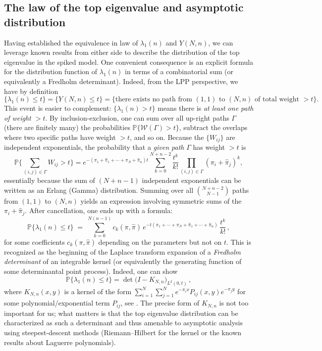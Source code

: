 \documentclass[letterpaper,11pt,oneside,reqno]{article}
\numberwithin{equation}{section}
\theoremstyle{definition}
\begin{document}
\subsection*{The law of the top eigenvalue and asymptotic distribution}
Having established the equivalence in law of $\lambda_1(n)$ and $Y(N,n)$, we can leverage known results from either side to describe the distribution of the top eigenvalue in the spiked model. One convenient consequence is an explicit formula for the distribution function of $\lambda_1(n)$ in terms of a combinatorial sum (or equivalently a Fredholm determinant). Indeed, from the LPP perspective, we have by definition
\[ \{\lambda_1(n) \le t\} = \{Y(N,n) \le t\} = \{\text{there exists no path from $(1,1)$ to $(N,n)$ of total weight $>t$}\}.\]
This event is easier to complement: $\{\lambda_1(n) > t\}$ means there is \emph{at least one path of weight $>t$}. By inclusion-exclusion, one can sum over all up-right paths $\Gamma$ (there are finitely many) the probabilities $\mathbb{P}\{\mathcal{W}(\Gamma) > t\}$, subtract the overlaps where two specific paths have weight $>t$, and so on. Because the $\{W_{ij}\}$ are independent exponentials, the probability that a \emph{given path} $\Gamma$ has weight $>\!t$ is
\[ \mathbb{P}\Big\{\sum_{(i,j)\in\Gamma} W_{ij} > t\Big\} = e^{-(\pi_1+\hat\pi_1+\cdots+\pi_N+\hat\pi_n) t} \sum_{k=0}^{N+n-2} \frac{t^k}{k!} \prod_{(i,j)\in\Gamma} (\pi_i+\hat\pi_j)^k,\]
essentially because the sum of $(N+n-1)$ independent exponentials can be written as an Erlang (Gamma) distribution. Summing over all $\binom{N+n-2}{N-1}$ paths from $(1,1)$ to $(N,n)$ yields an expression involving symmetric sums of the $\pi_i+\hat\pi_j$. After cancellation, one ends up with a formula:
\begin{equation}\label{eq:TWfiniteFredholm}
\mathbb{P}\{\lambda_1(n) \le t\} \;=\; \sum_{k=0}^{N(n-1)} c_{k}(\pi,\hat\pi)\, e^{-t (\pi_1+\cdots+\pi_N+\hat\pi_1+\cdots+\hat\pi_n)}\, \frac{t^k}{k!}\,,
\end{equation}
for some coefficients $c_k(\pi,\hat\pi)$ depending on the parameters but not on $t$. This is recognized as the beginning of the Laplace transform expansion of a \emph{Fredholm determinant} of an integrable kernel (or equivalently the generating function of some determinantal point process). Indeed, one can show
\[ \mathbb{P}\{\lambda_1(n) \le t\} = \det\big(I - K_{N,n}\big)_{L^2(0,t)}\,,\]
where $K_{N,n}(x,y)$ is a kernel of the form $\sum_{i=1}^{N} \sum_{j=1}^{N} e^{-\pi_i x} P_{ij}(x,y) e^{-\pi_j y}$ for some polynomial/exponential term $P_{ij}$, see \cite{BorodinPeche2009}. The precise form of $K_{N,n}$ is not too important for us; what matters is that the top eigenvalue distribution can be characterized as such a determinant and thus amenable to asymptotic analysis using steepest-descent methods (Riemann--Hilbert for the kernel or the known results about Laguerre polynomials).
\end{document}

